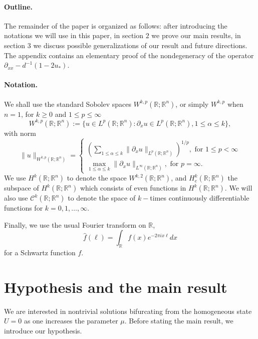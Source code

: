 \documentclass[letterpaper,11pt]{article}
\newcommand{\R}{\mathbb{R}}
\numberwithin{equation}{section}
\theoremstyle{plain}
\theoremstyle{remark}
\begin{document}
\paragraph{Outline.}The remainder of the paper is organized as follows: after introducing the notations we will use in this paper, in section $2$ we prove our main results, in section $3$ we discuss possible generalizations of our result and future directions. The appendix contains an elementary proof of the nondegeneracy of the operator $\partial_{xx}-d^{-1}(1-2u_*)$. 

\paragraph{Notation.}
We shall use the standard Sobolev spaces $W^{k,p}(\R; \R^n)$, or simply $W^{k,p}$ when $n=1$, for $k \ge 0$ and $1\le p \le \infty$
\[
W^{k,p}(\R;\R^n) := \{ u \in L^p(\R;\R^n): \partial_xu \in L^p(\R;\R^n), 1\le \alpha \le k \},
\]
with norm
\[
\|u\|_{W^{k,p}(\R;\R^n)}=
\begin{cases}
\left(\sum_{1\le \alpha\le k} \|\partial_xu \|_{L^p(\R;\R^n)}\right)^{1/p}, \text{ for }1\le p<\infty \\
\max_{1\le \alpha\le k}\|\partial_x u\|_{L^\infty(\R;\R^n)}, \text{ for }p=\infty.
\end{cases}
\]
We use $H^k(\R;\R^n)$ to denote the space $W^{k,2}(\R;\R^n)$, and $H^k_e(\R;\R^n)$ the subspace of $H^k(\R;\R^n)$ which consists of even functions in $H^k(\R;\R^n)$. We will also use $\mathscr{C}^k(\R;\R^n)$ to denote the space of $k-$times continuously differentiable functions for $k=0,1,\ldots,\infty$.

Finally, we use the usual Fourier transform on $\R$, 
\[
\widehat{f} (\ell)= \int_{\R} f(x)e^{-2\pi i x\ell}dx
\]
 for a Schwartz function $f$. 




\section{Hypothesis and the main result}

We are interested in nontrivial solutions bifurcating from the homogeneous state $U = 0$ as one increases the parameter $\mu$. Before stating the main result, we introduce our hypothesis.
\end{document}
